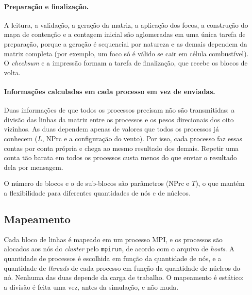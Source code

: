 \documentclass[11pt,a4paper]{article}
\begin{document}
\paragraph{Preparação e finalização.} A leitura, a validação, a geração da matriz, a aplicação dos focos, a construção do mapa de contenção e a contagem inicial são aglomeradas em uma única tarefa de preparação, porque a geração é sequencial por natureza e as demais dependem da matriz completa (por exemplo, um foco só é válido se cair em célula combustível). O \emph{checksum} e a impressão formam a tarefa de finalização, que recebe os blocos de volta.

\paragraph{Informações calculadas em cada processo em vez de enviadas.} Duas informações de que todos os processos precisam não são transmitidas: a divisão das linhas da matriz entre os processos e os pesos direcionais dos oito vizinhos. As duas dependem apenas de valores que todos os processos já conhecem ($L$, NPrc e a configuração do vento). Por isso, cada processo faz essas contas por conta própria e chega ao mesmo resultado dos demais. Repetir uma conta tão barata em todos os processos custa menos do que enviar o resultado dela por mensagem.

O número de blocos e o de sub-blocos são parâmetros (NPrc e $T$), o que mantém a flexibilidade para diferentes quantidades de nós e de núcleos.

\subsection{Mapeamento}
\label{sec:mapeamento}

Cada bloco de linhas é mapeado em um processo MPI, e os processos são alocados aos nós do \emph{cluster} pelo \texttt{mpirun}, de acordo com o arquivo de \emph{hosts}. A quantidade de processos é escolhida em função da quantidade de nós, e a quantidade de \emph{threads} de cada processo em função da quantidade de núcleos do nó. Nenhuma das duas depende da carga de trabalho. O mapeamento é estático: a divisão é feita uma vez, antes da simulação, e não muda.
\end{document}
